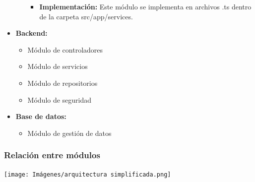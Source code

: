 \documentclass{article} %
\begin{document}
\begin{itemize}
\begin{itemize}
\begin{itemize}
                    \item \textbf{Implementación:} Este módulo se implementa en archivos .ts dentro de la carpeta src/app/services.
                \end{itemize}
        \end{itemize}
        \item \textbf{Backend:} 
        \begin{itemize}
            \item Módulo de controladores
            \item Módulo de servicios
            \item Módulo de repositorios
            \item Módulo de seguridad
        \end{itemize}
        \item \textbf{Base de datos:}
        \begin{itemize}
            \item Módulo de gestión de datos
        \end{itemize}
    \end{itemize}
    \subsubsection{Relación entre módulos}
    \texttt{[image: Imágenes/arquitectura simplificada.png]}
\end{document}
